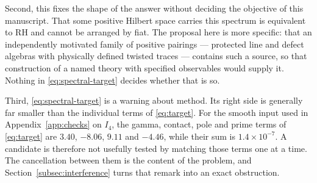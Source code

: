 Second, this fixes the shape of the answer without deciding the objective of
this manuscript. That some positive Hilbert space carries this spectrum is
equivalent to RH and cannot be arranged by fiat. The proposal here is more
specific: that an independently motivated family of positive pairings ---
protected line and defect algebras with physically defined twisted traces
--- contains such a source, so that construction of a named theory with
specified observables would supply it. Nothing in
\eqref{eq:spectral-target} decides whether that is so.

Third, \eqref{eq:spectral-target} is a warning about method. Its right side
is generally far smaller than the individual terms of \eqref{eq:target}. For
the smooth input used in Appendix~\ref{app:checks} on $I_4$, the gamma,
contact, pole and prime terms of \eqref{eq:target} are
$3.40$, $-8.06$, $9.11$ and $-4.46$, while their sum is $1.4\times10^{-7}$.
A candidate is therefore not usefully tested by matching those terms one at
a time. The cancellation between them is the content of the problem, and
Section~\ref{subsec:interference} turns that remark into an exact
obstruction.
